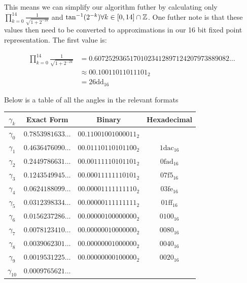 {This means we can simplify our algorithm futher by calculating only \(\prod_{k=0}^{14} \frac{1}{\sqrt{1 + 2^{-2k}}}\) and \(\tan^{-1}(2^{-k}) \forall k \in [0,14] \cap \mathbb{Z}\). One futher note is that these values then need to be converted to approximations in our 16 bit fixed point representation. The first value is: 

\begin{align*}
	\prod_{k=0}^{14} \frac{1}{\sqrt{1 + 2^{-2k}}} &= 
		0.60725293651701023412897124207973889082\ldots\\
		&\approx \textrm{00.10011011011101}_2\\
		&= \textrm{26dd}_{16}
\end{align*}

Below is a table of all the angles in the relevant formats

\begin{center}
\begin{tabular}{|c|c|c|c|}
	\hline
	\(\gamma_k\) & Exact Form & Binary & Hexadecimal \\\hline
	\(\gamma_0\) & \(0.7853981633\ldots\)
		& \(\textrm{00.11001001000011}_2\)
		& \(\textrm{3243}_{16}\\\hline
	\(\gamma_1\) & \(0.4636476090\ldots\)
		& \(\textrm{00.01110110101100}_2\)
		& \(\textrm{1dac}_{16}\)\\\hline
	\(\gamma_2\) & \(0.2449786631\ldots\)
		& \(\textrm{00.00111110101101}_2\)
		& \(\textrm{0fad}_{16}\)\\\hline
	\(\gamma_3\) & \(0.1243549945\ldots\)
		& \(\textrm{00.00011111110101}_2\)
		& \(\textrm{07f5}_{16}\)\\\hline
	\(\gamma_4\) & \(0.0624188099\ldots\)
		& \(\textrm{00.00001111111110}_2\)
		& \(\textrm{03fe}_{16}\)\\\hline
	\(\gamma_5\) & \(0.0312398334\ldots\)
		& \(\textrm{00.00000111111111}_2\)
		& \(\textrm{01ff}_{16}\)\\\hline
	\(\gamma_6\) & \(0.0156237286\ldots\)
		& \(\textrm{00.00000100000000}_2\)
		& \(\textrm{0100}_{16}\)\\\hline
	\(\gamma_7\) & \(0.0078123410\ldots\)
		& \(\textrm{00.00000010000000}_2\)
		& \(\textrm{0080}_{16}\)\\\hline
	\(\gamma_8\) & \(0.0039062301\ldots\)
		& \(\textrm{00.00000001000000}_2\)
		& \(\textrm{0040}_{16}\)\\\hline
	\(\gamma_9\) & \(0.0019531225\ldots\)
		& \(\textrm{00.00000000100000}_2\)
		& \(\textrm{0020}_{16}\)\\\hline
	\(\gamma_{10}\) & \(0.0009765621\ldots\)

\end{tabular}
\end{center}}
